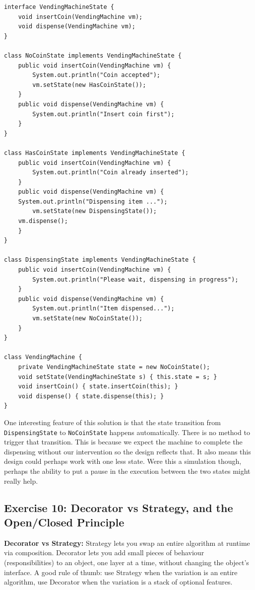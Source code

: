 \documentclass[twoside=false,DIV=14]{scrartcl}
\begin{document}
\begin{lstlisting}
interface VendingMachineState {
    void insertCoin(VendingMachine vm);
    void dispense(VendingMachine vm);
}

class NoCoinState implements VendingMachineState {
    public void insertCoin(VendingMachine vm) {
        System.out.println("Coin accepted");
        vm.setState(new HasCoinState());
    }
    public void dispense(VendingMachine vm) {
        System.out.println("Insert coin first");
    }
}

class HasCoinState implements VendingMachineState {
    public void insertCoin(VendingMachine vm) {
        System.out.println("Coin already inserted");
    }
    public void dispense(VendingMachine vm) {
	System.out.println("Dispensing item ...");
        vm.setState(new DispensingState());
	vm.dispense();
    }
}

class DispensingState implements VendingMachineState {
    public void insertCoin(VendingMachine vm) {
        System.out.println("Please wait, dispensing in progress");
    }
    public void dispense(VendingMachine vm) {
        System.out.println("Item dispensed...");
        vm.setState(new NoCoinState());
    }
}

class VendingMachine {
    private VendingMachineState state = new NoCoinState();
    void setState(VendingMachineState s) { this.state = s; }
    void insertCoin() { state.insertCoin(this); }
    void dispense() { state.dispense(this); }
}
\end{lstlisting}

One interesting feature of this solution is that the state transition from \texttt{DispensingState} to \texttt{NoCoinState} happens automatically.  There is no method to trigger that transition.  This is because we expect the machine to complete the dispensing without our intervention so the design reflects that.  It also means this design could perhaps work with one less state.  Were this a simulation though, perhaps the ability to put a pause in the execution between the two states might really help.

\subsection*{Exercise 10: Decorator vs Strategy, and the Open/Closed Principle}

\textbf{Decorator vs Strategy:} Strategy lets you swap an entire algorithm at runtime via composition.  Decorator lets you add small pieces of behaviour (responsibilities) to an object, one layer at a time, without changing the object's interface.  A good rule of thumb: use Strategy when the variation is an entire algorithm, use Decorator when the variation is a stack of optional features.
\end{document}
